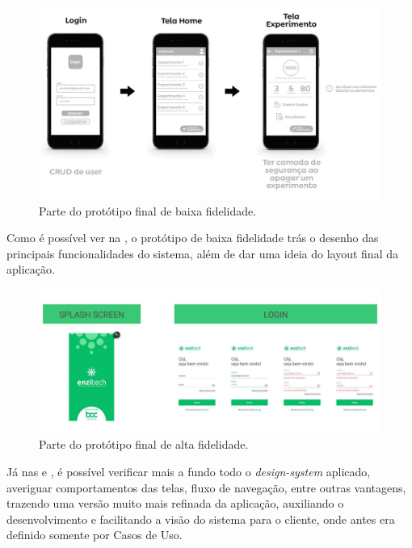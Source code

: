 \begin{figure}[H]
\centering
  \includegraphics[width=\columnwidth]{images/prototipo_baixa.pdf}
  \caption{Parte do protótipo final de baixa fidelidade.}
  \label{fig:prototipo_baixa}
\end{figure}

Como é possível ver na , o protótipo de baixa fidelidade trás o desenho das principais funcionalidades do sistema, além de dar uma ideia do layout final da aplicação.

\begin{figure}[H]
\centering
  \includegraphics[width=\columnwidth]{images/exemplo_prototipo_alta.pdf}
  \caption{Parte do protótipo final de alta fidelidade.}
  \label{fig:exemplo_prototipo_alta}
\end{figure}

Já nas  e , é possível verificar mais a fundo todo o \textit{design-system} aplicado, averiguar comportamentos das telas, fluxo de navegação, entre outras vantagens, trazendo uma versão muito mais refinada da aplicação, auxiliando o desenvolvimento e facilitando a visão do sistema para o cliente, onde antes era definido somente por Casos de Uso.

